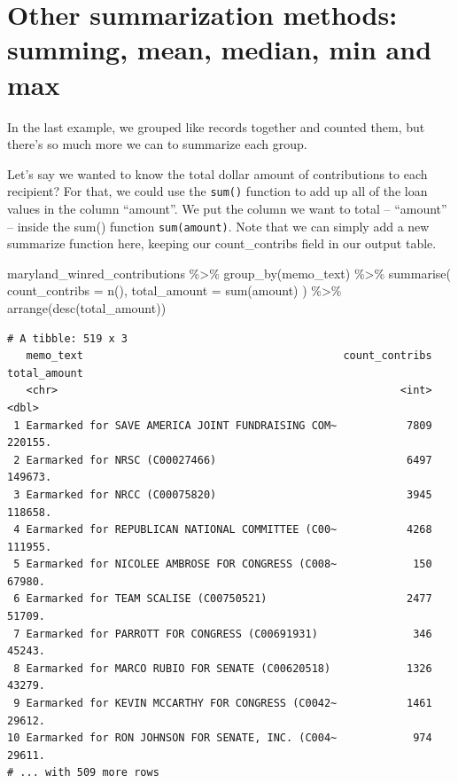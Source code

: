 \documentclass[
  letterpaper,
  DIV=11,
  numbers=noendperiod]{scrreprt}
\newenvironment{Shaded}{\begin{snugshade}}{\end{snugshade}}
\newcommand{\AttributeTok}[1]{\textcolor[rgb]{0.40,0.45,0.13}{#1}}
\newcommand{\FunctionTok}[1]{\textcolor[rgb]{0.28,0.35,0.67}{#1}}
\newcommand{\NormalTok}[1]{\textcolor[rgb]{0.00,0.23,0.31}{#1}}
\newcommand{\SpecialCharTok}[1]{\textcolor[rgb]{0.37,0.37,0.37}{#1}}
\begin{document}
\hypertarget{other-summarization-methods-summing-mean-median-min-and-max}{%
\section{Other summarization methods: summing, mean, median, min and
max}\label{other-summarization-methods-summing-mean-median-min-and-max}}

In the last example, we grouped like records together and counted them,
but there's so much more we can to summarize each group.

Let's say we wanted to know the total dollar amount of contributions to
each recipient? For that, we could use the \texttt{sum()} function to
add up all of the loan values in the column ``amount''. We put the
column we want to total -- ``amount'' -- inside the sum() function
\texttt{sum(amount)}. Note that we can simply add a new summarize
function here, keeping our count\_contribs field in our output table.

\begin{Shaded}
\begin{Highlighting}[]
\NormalTok{maryland\_winred\_contributions }\SpecialCharTok{\%\textgreater{}\%}
  \FunctionTok{group\_by}\NormalTok{(memo\_text) }\SpecialCharTok{\%\textgreater{}\%}
  \FunctionTok{summarise}\NormalTok{(}
    \AttributeTok{count\_contribs =} \FunctionTok{n}\NormalTok{(),}
    \AttributeTok{total\_amount =} \FunctionTok{sum}\NormalTok{(amount)}
\NormalTok{  ) }\SpecialCharTok{\%\textgreater{}\%}
  \FunctionTok{arrange}\NormalTok{(}\FunctionTok{desc}\NormalTok{(total\_amount))}
\end{Highlighting}
\end{Shaded}

\begin{verbatim}
# A tibble: 519 x 3
   memo_text                                         count_contribs total_amount
   <chr>                                                      <int>        <dbl>
 1 Earmarked for SAVE AMERICA JOINT FUNDRAISING COM~           7809      220155.
 2 Earmarked for NRSC (C00027466)                              6497      149673.
 3 Earmarked for NRCC (C00075820)                              3945      118658.
 4 Earmarked for REPUBLICAN NATIONAL COMMITTEE (C00~           4268      111955.
 5 Earmarked for NICOLEE AMBROSE FOR CONGRESS (C008~            150       67980.
 6 Earmarked for TEAM SCALISE (C00750521)                      2477       51709.
 7 Earmarked for PARROTT FOR CONGRESS (C00691931)               346       45243.
 8 Earmarked for MARCO RUBIO FOR SENATE (C00620518)            1326       43279.
 9 Earmarked for KEVIN MCCARTHY FOR CONGRESS (C0042~           1461       29612.
10 Earmarked for RON JOHNSON FOR SENATE, INC. (C004~            974       29611.
# ... with 509 more rows
\end{verbatim}
\end{document}
